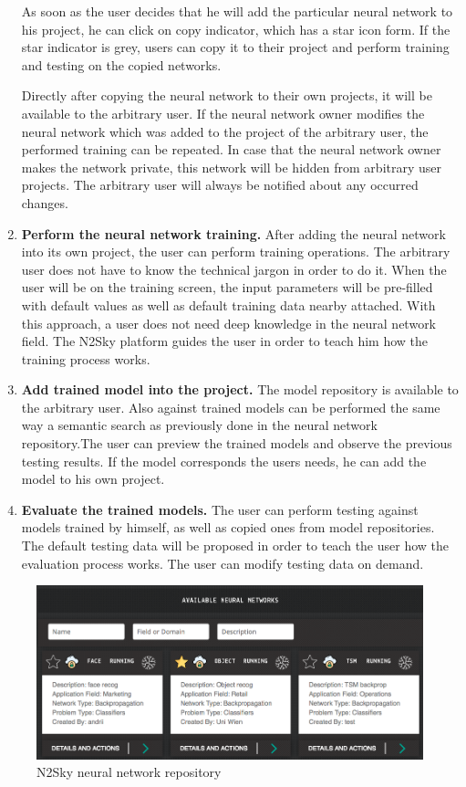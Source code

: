 \documentclass[conference]{IEEEtran}
\begin{document}
\begin{enumerate}
As soon as the user decides that he will add the particular neural network to his project, he can click on copy indicator, which has a star icon form. If the star indicator is grey, users can copy it to their project and perform training and testing on the copied networks. 

Directly after copying the neural network to their own projects, it will be available to the arbitrary user. If the neural network owner modifies the neural network which was added to the project of the arbitrary user, the performed training can be repeated. In case that the neural network owner makes the network private, this network will be hidden from arbitrary user projects. The arbitrary user will always be notified about any occurred changes. 
\item \textbf{Perform the neural network training.} After adding the neural network into its own project, the user can perform training operations. The arbitrary user does not have to know the technical jargon in order to do it. When the user will be on the training screen, the input parameters will be pre-filled with default values as well as default training data nearby attached. With this approach, a user does not need deep knowledge in the neural network field. The N2Sky platform guides the user in order to teach him how the training process works. 
\item \textbf{Add trained model into the project.} The model repository is available to the arbitrary user. Also against trained models can be performed the same way a semantic search as previously done in the neural network repository.The user can preview the trained models and observe the previous testing results. If the model corresponds the users needs, he can add the model to his own project.
\item \textbf{Evaluate the trained models.} The user can perform testing against models trained by himself, as well as copied ones from model repositories. The default testing data will be proposed in order to teach the user how the evaluation process works. The user can modify testing data on demand.
\end{enumerate}

\begin{figure}
  \includegraphics[width=\linewidth]{repo.png}
  \caption{N2Sky neural network repository}
  \label{fig:repo}
\end{figure}
\end{document}
